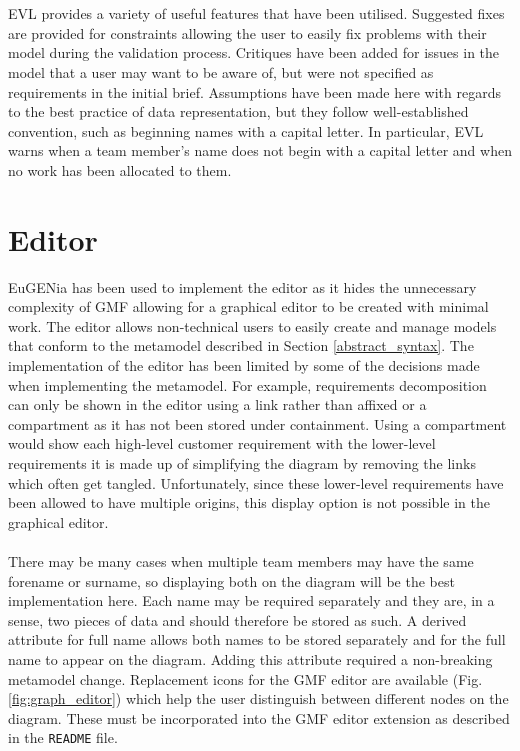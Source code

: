 \documentclass{article}
\begin{document}
\\\\
EVL provides a variety of useful features that have been utilised. Suggested fixes are provided for constraints allowing the user to easily fix problems with their model during the validation process. Critiques have been added for issues in the model that a user may want to be aware of, but were not specified as requirements in the initial brief. Assumptions have been made here with regards to the best practice of data representation, but they follow well-established convention, such as beginning names with a capital letter. In particular, EVL warns when a team member's name does not begin with a capital letter and when no work has been allocated to them.

\section{Editor}
\label{editor}
EuGENia has been used to implement the editor as it hides the unnecessary complexity of GMF allowing for a graphical editor to be created with minimal work. The editor allows non-technical users to easily create and manage models that conform to the metamodel described in Section \ref{abstract_syntax}. The implementation of the editor has been limited by some of the decisions made when implementing the metamodel. For example, requirements decomposition can only be shown in the editor using a link rather than affixed or a compartment as it has not been stored under containment. Using a compartment would show each high-level customer requirement with the lower-level requirements it is made up of simplifying the diagram by removing the links which often get tangled. Unfortunately, since these lower-level requirements have been allowed to have multiple origins, this display option is not possible in the graphical editor.
\\\\
There may be many cases when multiple team members may have the same forename or surname, so displaying both on the diagram will be the best implementation here. Each name may be required separately and they are, in a sense, two pieces of data and should therefore be stored as such. A derived attribute for full name allows both names to be stored separately and for the full name to appear on the diagram. Adding this attribute required a non-breaking metamodel change. Replacement icons for the GMF editor are available (Fig. \ref{fig:graph_editor}) which help the user distinguish between different nodes on the diagram. These must be incorporated into the GMF editor extension as described in the \texttt{README} file.
\end{document}
